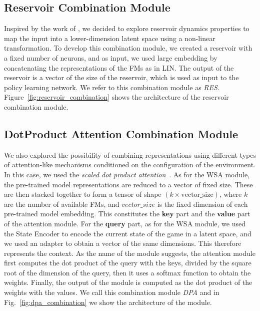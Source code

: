 \subsection{Reservoir Combination Module}
\label{sec:reservoir_combination}
Inspired by the work of \citet{gallicchio2017}, we decided to explore reservoir dynamics properties to map the input into a lower-dimension latent space using a non-linear transformation.
To develop this combination module, we created a reservoir with a fixed number of neurons, and as input, we used large embedding by concatenating the representations of the FMs as in LIN\@.
The output of the reservoir is a vector of the size of the reservoir, which is used as input to the policy learning network.
We refer to this combination module as \textit{RES}.
Figure~\ref{fig:reservoir_combination} shows the architecture of the reservoir combination module.

\subsection{DotProduct Attention Combination Module}
\label{sec:dpa}

We also explored the possibility of combining representations using different types of attention-like mechanisms conditioned on the configuration of the environment.
In this case, we used the \textit{scaled dot product attention}~\citep{vaswani2017attention}.
As for the WSA module, the pre-trained model representations are reduced to a vector of fixed size.
These are then stacked together to form a tensor of shape $(k \times \text{vector\_size})$, where $k$ are the number of available FMs, and $vector\_size$ is the fixed dimension of each pre-trained model embedding.
This constitutes the \textbf{key} part and the \textbf{value} part of the attention module.
For the \textbf{query} part, as for the WSA module, we used the State Encoder to encode the current state of the game in a latent space, and we used an adapter to obtain a vector of the same dimensions.
This therefore represents the context.
As the name of the module suggests, the attention module first computes the dot product of the query with the keys, divided by the square root of the dimension of the query, then it uses a softmax function to obtain the weights.
Finally, the output of the module is computed as the dot product of the weights with the values.
We call this combination module \textit{DPA} and in Fig.~\ref{fig:dpa_combination} we show the architecture of the module.



